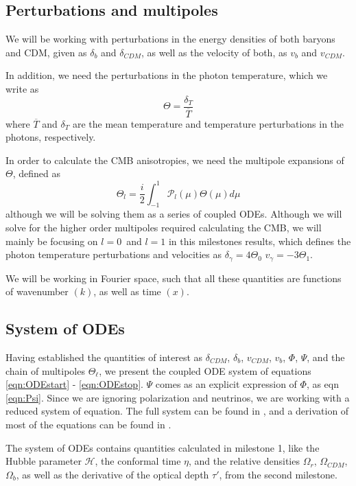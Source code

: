 \documentclass[10pt, a4paper]{article}
\renewcommand{\bar}{\overline}
\begin{document}
\subsection{Perturbations and multipoles}
We will be working with perturbations in the energy densities of both baryons and CDM, given as $\delta_{b}$ and $\delta_{CDM}$, as well as the velocity of both, as $v_{b}$ and $v_{CDM}$.

In addition, we need the perturbations in the photon temperature, which we write as
\begin{equation}
    \Theta = \frac{\delta_T}{\bar{T}}
\end{equation}
where $\bar{T}$ and $\delta_{T}$ are the mean temperature and temperature perturbations in the photons, respectively.

In order to calculate the CMB anisotropies, we need the multipole expansions of $\Theta$, defined as\cite{callin2006}
\begin{equation}
\Theta_{l}=\frac{i}{2} \int_{-1}^{1} \mathcal{P}_{l}(\mu) \Theta(\mu) d \mu
\end{equation}
although we will be solving them as a series of coupled ODEs. Although we will solve for the higher order multipoles required calculating the CMB, we will mainly be focusing on $l=0$ and $l=1$ in this milestones results, which defines the photon temperature perturbations and velocities as $\delta_\gamma = 4\Theta_0$ $v_\gamma = -3\Theta_1$.

We will be working in Fourier space, such that all these quantities are functions of wavenumber $(k)$, as well as time $(x)$.


\subsection{System of ODEs}
Having established the quantities of interest as $\delta_{CDM}$, $\delta_{b}$, $v_{CDM}$, $v_{b}$, $\Phi$, $\Psi$, and the chain of multipoles $\Theta_\ell$, we present the coupled ODE system of equations \ref{eqn:ODEstart} - \ref{eqn:ODEstop}. $\Psi$ comes as an explicit expression of $\Phi$, as eqn \ref{eqn:Psi}. Since we are ignoring polarization and neutrinos, we are working with a reduced system of equation. The full system can be found in \cite{callin2006}, and a derivation of most of the equations can be found in \cite{ModernCosmology2003}.

The system of ODEs contains quantities calculated in milestone 1, like the Hubble parameter $\mathcal{H}$, the conformal time $\eta$, and the relative densities $\Omega_r$, $\Omega_{CDM}$, $\Omega_b$, as well as the derivative of the optical depth $\tau'$, from the second milestone.
\end{document}
